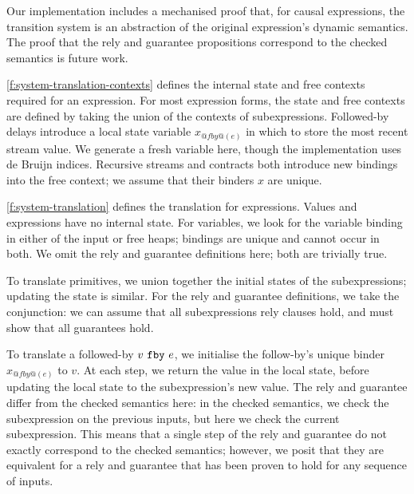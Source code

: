 Our implementation includes a mechanised proof that, for causal expressions, the transition system is an abstraction of the original expression's dynamic semantics.
The proof that the rely and guarantee propositions correspond to the checked semantics is future work.





\autoref{f:system-translation-contexts} defines the internal state and free contexts required for an expression.
For most expression forms, the state and free contexts are defined by taking the union of the contexts of subexpressions.
Followed-by delays introduce a local state variable $x_{@fby@(e)}$ in which to store the most recent stream value.
We generate a fresh variable here, though the implementation uses de Bruijn indices.
Recursive streams and contracts both introduce new bindings into the free context; we assume that their binders $x$ are unique.

\autoref{f:system-translation} defines the translation for expressions.
Values and expressions have no internal state.
For variables, we look for the variable binding in either of the input or free heaps; bindings are unique and cannot occur in both.
We omit the rely and guarantee definitions here; both are trivially true.

To translate primitives, we union together the initial states of the subexpressions; updating the state is similar.
For the rely and guarantee definitions, we take the conjunction: we can assume that all subexpressions rely clauses hold, and must show that all guarantees hold.

To translate a followed-by $v~\texttt{fby}~e$, we initialise the follow-by's unique binder $x_{@fby@(e)}$ to $v$.
At each step, we return the value in the local state, before updating the local state to the subexpression's new value.
The rely and guarantee differ from the checked semantics here: in the checked semantics, we check the subexpression on the previous inputs, but here we check the current subexpression.
This means that a single step of the rely and guarantee do not exactly correspond to the checked semantics; however, we posit that they are equivalent for a rely and guarantee that has been proven to hold for any sequence of inputs.


